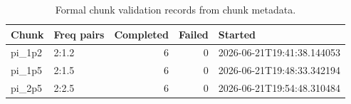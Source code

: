 \begin{table}[htbp]
\centering
\footnotesize
\caption{Formal chunk validation records from chunk metadata.}
\label{tab:chunks}
\begin{tabular}{@{}llrrl@{}}
\toprule
\textbf{Chunk} & \textbf{Freq pairs} & \textbf{Completed} & \textbf{Failed} & \textbf{Started} \\
\midrule
pi\_1p2 & 2:1.2 & 6 & 0 & 2026-06-21T19:41:38.144053 \\
pi\_1p5 & 2:1.5 & 6 & 0 & 2026-06-21T19:48:33.342194 \\
pi\_2p5 & 2:2.5 & 6 & 0 & 2026-06-21T19:54:48.310484 \\
\bottomrule
\end{tabular}
\end{table}

